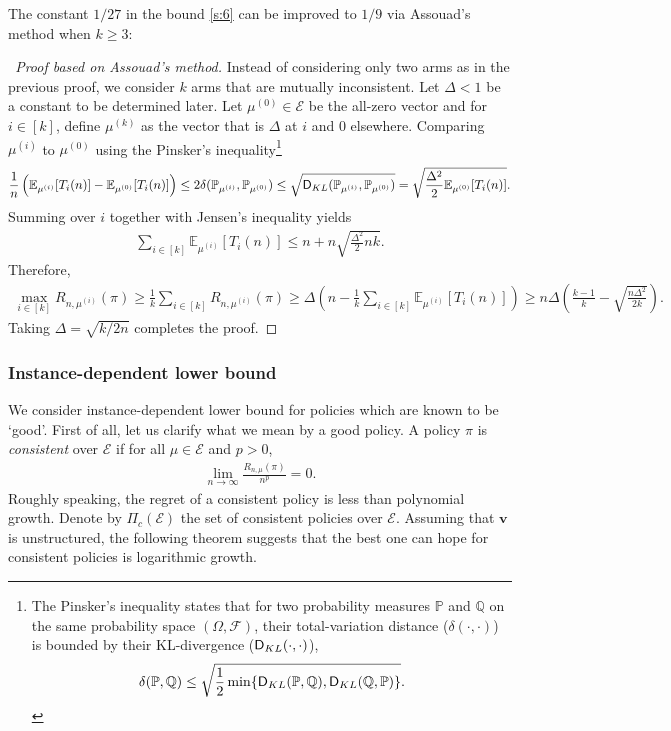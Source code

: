 \documentclass[10pt,a4article]{article}
\numberwithin{equation}{section}
\theoremstyle{plain}
\theoremstyle{definition}
\def\Q{{\mathbb Q}}
\def\E{{\mathbb E}}
\def\P{{\mathbb P}}
\def\V{{\mathcal E}}
\def\v{{\mathbf{v}}}
\begin{document}
The constant $1/27$ in the bound \eqref{s:6} can be improved to $1/9$ via Assouad's method when $k\geq 3$: 

\begin{proof}[~Proof based on Assouad's method]
Instead of considering only two arms as in the previous proof, we consider $k$ arms that are mutually inconsistent. Let $\Delta<1$ be a constant to be determined later. Let $\mu^{(0)}\in\mathcal E$ be the all-zero vector and for $i\in [k]$, define $\mu^{(k)}$ as the vector that is $\Delta$ at $i$ and $0$ elsewhere. Comparing $\mu^{(i)}$ to $\mu^{(0)}$ using the Pinsker's inequality\footnote{The Pinsker's inequality states that for two probability measures $\P$ and $\Q$ on the same probability space $(\Omega, \mathcal{F})$, their total-variation distance ($\delta(\cdot, \cdot)$) is bounded by their KL-divergence ($\textsf D_{KL}(\cdot, \cdot)$), 
\begin{align}
\delta (\P, \Q)\leq\sqrt{\frac{1}{2}\min\{\textsf D_{KL}(\P, \Q), \textsf D_{KL}(\Q, \P)\}}. \label{s:pinsker}
\end{align}} 
\begin{align*}
\frac{1}{n}\left(\E_{\mu^{(i)}}[T_i(n)]-\E_{\mu^{(0)}}[T_i(n)]\right)\leq 2\delta(\P_{\mu^{(i)}}, \P_{\mu^{(0)}})\leq\sqrt{\textsf D_{KL}(\P_{\mu^{(i)}}, \P_{\mu^{(0)}})}=\sqrt{\frac{\Delta^2}{2}\E_{\mu^{(0)}}[T_i(n)]}. 
\end{align*}
Summing over $i$ together with Jensen's inequality yields
\begin{align*}
\sum_{i\in [k]}\E_{\mu^{(i)}}[T_i(n)]\leq n+n\sqrt{\frac{\Delta^2}{2}nk}. 
\end{align*}
Therefore,
\begin{align*}
\max_{i\in [k]}R_{n, \mu^{(i)}}(\pi)\geq\frac{1}{k}\sum_{i\in [k]}R_{n, \mu^{(i)}}(\pi)\geq \Delta\left(n-\frac{1}{k}\sum_{i\in [k]}\E_{\mu^{(i)}}[T_i(n)]\right)\geq n\Delta\left(\frac{k-1}{k}-\sqrt{\frac{n\Delta^2}{2k}}\right). 
\end{align*}
Taking $\Delta=\sqrt{k/2n}$ completes the proof. 
\end{proof}


\subsubsection{Instance-dependent lower bound}

We consider instance-dependent lower bound for policies which are known to be `good'. First of all, let us clarify what we mean by a good policy. A policy $\pi$ is \emph{consistent} over $\V$ if for all $\mu\in\V$ and $p>0$, 
\begin{align*}
\lim_{n\rightarrow\infty}\frac{R_{n, \mu}(\pi)}{n^p} = 0. 
\end{align*}
Roughly speaking, the regret of a consistent policy is less than polynomial growth. Denote by $\Pi_{c}(\V)$ the set of consistent policies over $\V$. Assuming that $\v$ is unstructured, the following theorem suggests that the best one can hope for consistent policies is logarithmic growth. 
\end{document}
